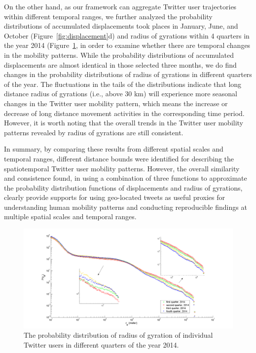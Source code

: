 \documentclass[ijgi,article,accept,moreauthors,pdftex,10pt,a4paper]{mdpi}
\theoremstyle{mdpi}
\newcounter{ex}
\newcounter{re}
\theoremstyle{mdpidefinition}
\begin{document}
On the other hand, as our framework can aggregate Twitter user trajectories within different temporal ranges, we further analyzed the probability distributions of accumulated displacements took places in January, June, and October (Figure~\ref{fig:displacement}d) and radius of gyrations within 4 quarters in the year 2014 (Figure~\ref{fig:gyration_season}, in order to examine whether there are temporal changes in the mobility patterns.
While the probability distributions of accumulated displacements are almost identical in those selected three months,  we do find changes in the probability distributions of radius of gyrations in different quarters of the year. 
The fluctuations in the tails of the distributions indicate that long distance radius of gyrations (i.e., above 30 km) will experience more seasonal changes in the Twitter user mobility pattern, which means the increase or decrease of long distance movement activities in the corresponding time period. 
However, it is worth noting that the overall trends in the Twitter user mobility patterns revealed by radius of gyrations are still consistent.

In summary, by comparing these results from different spatial scales and temporal ranges, different distance bounds were identified for describing the spatiotemporal Twitter user mobility patterns.
However, the overall similarity and consistence found, in using a combination of three functions to approximate the probability distribution functions of displacements and radius of gyrations, clearly provide supports for using geo-located tweets as useful proxies for understanding human mobility patterns and conducting reproducible findings at multiple spatial scales and temporal ranges.
 
\begin{figure}[ht]
\centering
\includegraphics[width=1.0\linewidth]{./figures/gyration_season}
\caption{The probability distribution of radius of gyration of individual Twitter users in different quarters of the year 2014.}
\label{fig:gyration_season}
\end{figure}
\FloatBarrier
\end{document}
